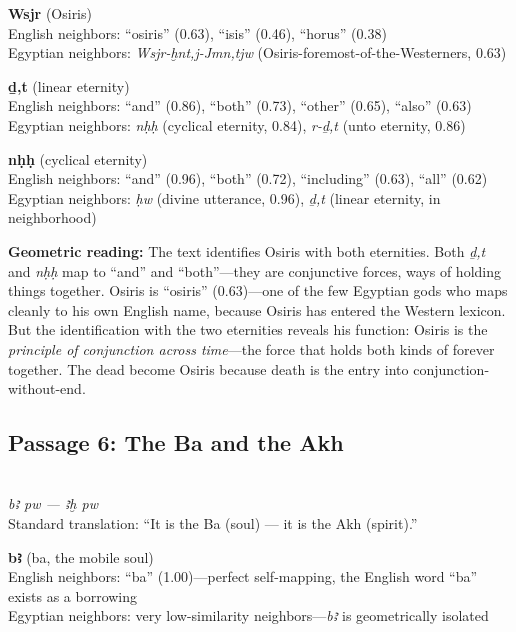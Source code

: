 \documentclass[11pt, a4paper]{article}
\newcommand{\passagehiero}[1]{{\normalfont\hierofont\fontsize{14}{17}\selectfont #1}}
\begin{document}
\bigskip

\noindent\textbf{Wsjr} (Osiris)\\
English neighbors: ``osiris'' (0.63), ``isis'' (0.46), ``horus'' (0.38)\\
Egyptian neighbors: \textit{Wsjr-ḫnt,j-Jmn,tjw} (Osiris-foremost-of-the-Westerners, 0.63)

\medskip

\noindent\textbf{ḏ,t} (linear eternity)\\
English neighbors: ``and'' (0.86), ``both'' (0.73), ``other'' (0.65), ``also'' (0.63)\\
Egyptian neighbors: \textit{nḥḥ} (cyclical eternity, 0.84), \textit{r-ḏ,t} (unto eternity, 0.86)

\medskip

\noindent\textbf{nḥḥ} (cyclical eternity)\\
English neighbors: ``and'' (0.96), ``both'' (0.72), ``including'' (0.63), ``all'' (0.62)\\
Egyptian neighbors: \textit{ḥw} (divine utterance, 0.96), \textit{ḏ,t} (linear eternity, in neighborhood)

\medskip

{\color{insight}\textbf{Geometric reading:}} The text identifies Osiris with both eternities. Both \textit{ḏ,t} and \textit{nḥḥ} map to ``and'' and ``both''---they are conjunctive forces, ways of holding things together. Osiris is ``osiris'' (0.63)---one of the few Egyptian gods who maps cleanly to his own English name, because Osiris has entered the Western lexicon. But the identification with the two eternities reveals his function: Osiris is the \textit{principle of conjunction across time}---the force that holds both kinds of forever together. The dead become Osiris because death is the entry into conjunction-without-end.

\subsection{Passage 6: The Ba and the Akh}

{\color{passage}\passagehiero{𓅡𓏲 𓊪𓅱 --- 𓅜𓇋𓏭 𓊪𓅱}\\\medskip
\textit{\small bꜣ pw --- ꜣḫ pw}\\
Standard translation: ``It is the Ba (soul) --- it is the Akh (spirit).''}

\bigskip

\noindent\textbf{bꜣ} (ba, the mobile soul)\\
English neighbors: ``ba'' (1.00)---perfect self-mapping, the English word ``ba'' exists as a borrowing\\
Egyptian neighbors: very low-similarity neighbors---\textit{bꜣ} is geometrically isolated
\end{document}
